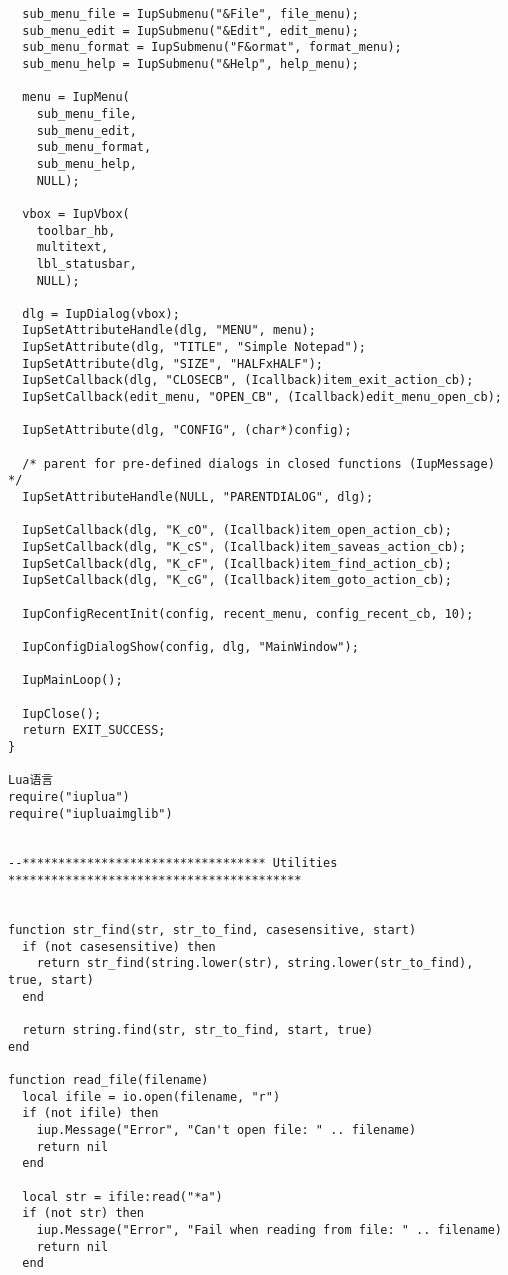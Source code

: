 \documentclass{ctexart}
\begin{document}
\begin{lstlisting}
  sub_menu_file = IupSubmenu("&File", file_menu);
  sub_menu_edit = IupSubmenu("&Edit", edit_menu);
  sub_menu_format = IupSubmenu("F&ormat", format_menu);
  sub_menu_help = IupSubmenu("&Help", help_menu);

  menu = IupMenu(
    sub_menu_file,
    sub_menu_edit,
    sub_menu_format,
    sub_menu_help,
    NULL);

  vbox = IupVbox(
    toolbar_hb,
    multitext,
    lbl_statusbar,
    NULL);

  dlg = IupDialog(vbox);
  IupSetAttributeHandle(dlg, "MENU", menu);
  IupSetAttribute(dlg, "TITLE", "Simple Notepad");
  IupSetAttribute(dlg, "SIZE", "HALFxHALF");
  IupSetCallback(dlg, "CLOSECB", (Icallback)item_exit_action_cb);
  IupSetCallback(edit_menu, "OPEN_CB", (Icallback)edit_menu_open_cb);

  IupSetAttribute(dlg, "CONFIG", (char*)config);

  /* parent for pre-defined dialogs in closed functions (IupMessage) */
  IupSetAttributeHandle(NULL, "PARENTDIALOG", dlg);

  IupSetCallback(dlg, "K_cO", (Icallback)item_open_action_cb);
  IupSetCallback(dlg, "K_cS", (Icallback)item_saveas_action_cb);
  IupSetCallback(dlg, "K_cF", (Icallback)item_find_action_cb);
  IupSetCallback(dlg, "K_cG", (Icallback)item_goto_action_cb);

  IupConfigRecentInit(config, recent_menu, config_recent_cb, 10);

  IupConfigDialogShow(config, dlg, "MainWindow");

  IupMainLoop();

  IupClose();
  return EXIT_SUCCESS;
}

Lua语言
require("iuplua")
require("iupluaimglib")


--********************************** Utilities *****************************************


function str_find(str, str_to_find, casesensitive, start)
  if (not casesensitive) then
    return str_find(string.lower(str), string.lower(str_to_find), true, start)
  end

  return string.find(str, str_to_find, start, true)
end

function read_file(filename)
  local ifile = io.open(filename, "r")
  if (not ifile) then
    iup.Message("Error", "Can't open file: " .. filename)
    return nil
  end
  
  local str = ifile:read("*a")
  if (not str) then
    iup.Message("Error", "Fail when reading from file: " .. filename)
    return nil
  end
  

\end{lstlisting}
\end{document}
